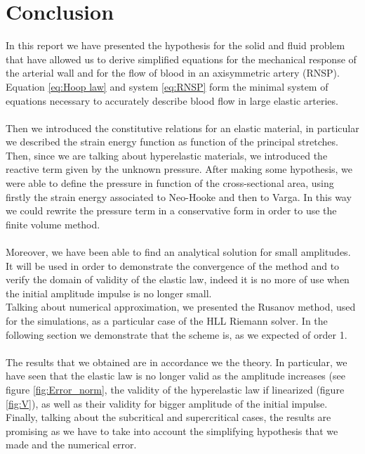 \documentclass[12pt,a4paper]{article}
\numberwithin{equation}{section}
\begin{document}
\section*{Conclusion}
In this report we have presented the hypothesis for the solid and fluid problem that have allowed us to derive simplified equations for the mechanical response of the arterial wall and for the flow of blood in an axisymmetric artery (RNSP). Equation \ref{eq:Hoop law} and system \ref{eq:RNSP} form the minimal system of equations necessary to accurately describe blood flow in large elastic arteries. \\
\\
Then we introduced the constitutive relations for an elastic material, in particular we described the strain energy function as function of the principal stretches. Then, since we are talking about hyperelastic materials, we introduced the reactive term given by the unknown pressure.  After making some hypothesis, we were able to define the pressure in function of the cross-sectional area, using firstly the strain energy associated to Neo-Hooke and then to Varga. In this way we could rewrite the pressure term in a conservative form in order to use the finite volume method.\\
\\
Moreover, we have been able to find an analytical solution for small amplitudes. It will be used in order to demonstrate the convergence of the method and to verify the domain of validity of the elastic law, indeed it is no more of use when the initial amplitude impulse is no longer small.\\
Talking about numerical approximation, we presented the Rusanov method, used for the simulations, as a particular case of the HLL Riemann solver. In the following section we demonstrate that the scheme is, as we expected of order 1.\\
\\
The results that we obtained are in accordance we the theory. In particular, we have seen that the elastic law is no longer valid as the amplitude increases (see figure \ref{fig:Error_norm}, the validity of the hyperelastic law if linearized (figure \ref{fig:V}), as well as their validity for bigger amplitude of the initial impulse.\\
Finally, talking about the subcritical and supercritical cases, the results are promising as we have to take into account the simplifying hypothesis that we made and the numerical error.
\newpage
\nocite{*}


\end{document}
